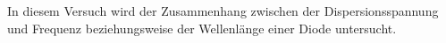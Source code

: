 In diesem Versuch wird der Zusammenhang zwischen der Dispersionsspannung und Frequenz beziehungsweise der Wellenlänge  einer Diode untersucht.